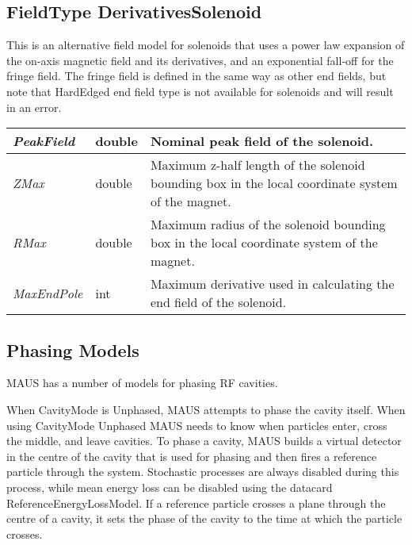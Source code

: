 \subsection{FieldType DerivativesSolenoid}
This is an alternative field model for solenoids that uses a power law expansion of the on-axis magnetic field and its
derivatives, and an exponential fall-off for the fringe field. The fringe field is defined in the same way as other end
fields, but note that HardEdged end field type is not available for solenoids and will result in an error.

\begin{center}
\tabletail{}
\tablelasttail{}
\begin{supertabular}{|m{3.665cm}|m{1.278cm}|m{12.052cm}|}
\hline
{\itshape PeakField} &
double &
Nominal peak field of the solenoid.\\\hline
{\itshape ZMax} &
double &
Maximum z-half length of the solenoid bounding box in the local coordinate system of the magnet.\\\hline
{\itshape RMax} &
double &
Maximum radius of the solenoid bounding box in the local coordinate system of the magnet.\\\hline
{\itshape MaxEndPole} &
int &
Maximum derivative used in calculating the end field of the solenoid.\\\hline
\end{supertabular}
\end{center}
\subsection{Phasing Models}
MAUS has a number of models for phasing RF cavities.

When CavityMode is Unphased, MAUS attempts to phase the cavity itself. When using CavityMode Unphased MAUS needs to
know when particles enter, cross the middle, and leave cavities. To phase a cavity, MAUS builds a virtual detector in the
centre of the cavity that is used for phasing and then fires a reference particle through the system. Stochastic
processes are always disabled during this process, while mean energy
loss can be disabled using the datacard ReferenceEnergyLossModel. If a reference particle crosses a plane through the
centre of a cavity, it sets the phase of the cavity to the time at which the particle crosses. 

